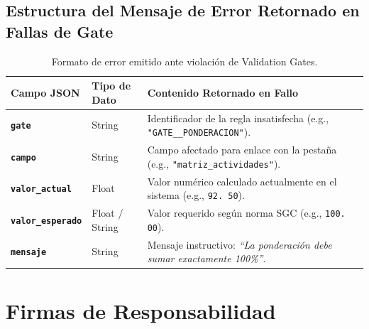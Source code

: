 \documentclass[12pt,a4paper]{article}
\begin{document}
\subsection{Estructura del Mensaje de Error Retornado en Fallas de Gate}
\begin{table}[H]
\centering
\small
\renewcommand{\arraystretch}{1.2}
\begin{tabularx}{\textwidth}{|>{\hsize=0.8\hsize\raggedright\arraybackslash\bfseries\footnotesize}X|>{\hsize=0.6\hsize\centering\arraybackslash\footnotesize}X|>{\hsize=1.6\hsize\raggedright\arraybackslash\footnotesize}X|}
\hline
\rowcolor{tableheader}
\textbf{Campo JSON} & \textbf{Tipo de Dato} & \textbf{Contenido Retornado en Fallo} \\
\hline
\texttt{gate} & String & Identificador de la regla insatisfecha (e.g., \texttt{"GATE\_\allowbreak  02\_\allowbreak  PONDERACION"}). \\
\hline
\texttt{campo} & String & Campo afectado para enlace con la pestaña (e.g., \texttt{"matriz\_\allowbreak  actividades"}). \\
\hline
\texttt{valor\_\allowbreak  actual} & Float & Valor numérico calculado actualmente en el sistema (e.g., \texttt{92. 50}). \\
\hline
\texttt{valor\_\allowbreak  esperado} & Float / String & Valor requerido según norma SGC (e.g., \texttt{100. 00}). \\
\hline
\texttt{mensaje} & String & Mensaje instructivo: \textit{``La ponderación debe sumar exactamente 100\%''}. \\
\hline
\end{tabularx}
\caption{Formato de error emitido ante violación de Validation Gates.}
\end{table}

\section{Firmas de Responsabilidad}
\end{document}

